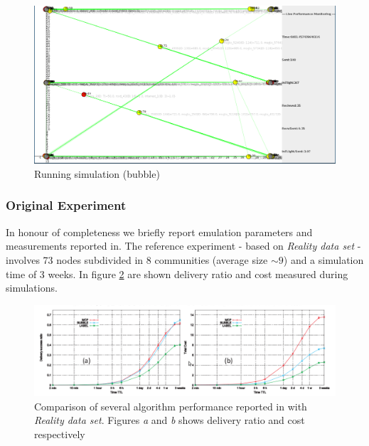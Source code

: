\begin{figure}[h!]
	\begin{center}
    \includegraphics[scale=0.25]{img/bubble_live.png}
    \caption{Running simulation (bubble)}
    \label{fig:bubble_live}
  \end{center}
\end{figure}

\newpage
\subsubsection{Original Experiment}
In honour of completeness we briefly report emulation parameters and measurements reported in\cite[Table 3,6.2]{bubble}. The reference experiment - based on \emph{Reality data set} - involves 73 nodes subdivided in 8 communities (average size $\sim 9$) and a simulation time of 3 weeks. In figure \ref{fig:reality_emulation} are shown delivery ratio and cost measured during simulations.
\begin{center}
\begin{figure}[h!]
    		\includegraphics[scale=0.35]{img/reality_emulation.png}
    		\caption{Comparison of several algorithm performance reported in \cite{bubble} with \emph{Reality data set}. Figures \emph{a} and \emph{b} shows delivery ratio and cost respectively}
    		\label{fig:reality_emulation}
\end{figure}
\end{center}

